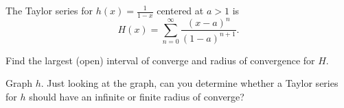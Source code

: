 \documentclass{workbook}
\begin{document}
\begin{slide}
	\question
The Taylor series for $h(x)=\frac{1}{1-x}$ centered at $a>1$ is
		\[
			H(x)=\sum_{n=0}^\infty \frac{(x-a)^n}{(1-a)^{n+1}}.
		\]


	\begin{parts}
		\item Find the largest (open) interval of converge and radius of convergence for $H$.
		\item Graph $h$. Just looking at the graph, can you determine 
		whether a Taylor series for $h$ should have an infinite or finite radius of converge?
	\end{parts}
\end{slide}
\end{document}
